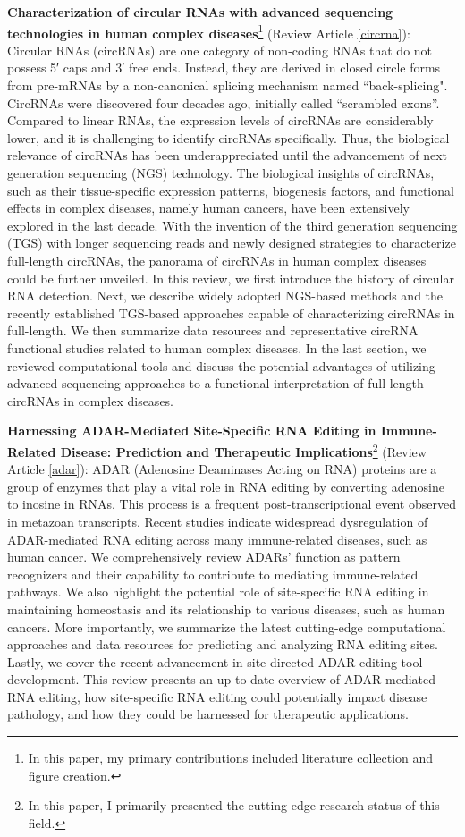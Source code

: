 \textbf{Characterization of circular RNAs with advanced sequencing technologies in human complex diseases}\footnote{In this paper, my primary contributions included literature collection and figure creation.} (Review Article \ref{circrna}): Circular RNAs (circRNAs) are one category of non-coding RNAs that do not possess 5′ caps and 3′ free ends. Instead, they are derived in closed circle forms from pre-mRNAs by a non-canonical splicing mechanism named ``back-splicing". CircRNAs were discovered four decades ago, initially called ``scrambled exons''. Compared to linear RNAs, the expression levels of circRNAs are considerably lower, and it is challenging to identify circRNAs specifically. Thus, the biological relevance of circRNAs has been underappreciated until the advancement of next generation sequencing (NGS) technology. The biological insights of circRNAs, such as their tissue-specific expression patterns, biogenesis factors, and functional effects in complex diseases, namely human cancers, have been extensively explored in the last decade. With the invention of the third generation sequencing (TGS) with longer sequencing reads and newly designed strategies to characterize full-length circRNAs, the panorama of circRNAs in human complex diseases could be further unveiled. In this review, we first introduce the history of circular RNA detection. Next, we describe widely adopted NGS-based methods and the recently established TGS-based approaches capable of characterizing circRNAs in full-length. We then summarize data resources and representative circRNA functional studies related to human complex diseases. In the last section, we reviewed computational tools and discuss the potential advantages of utilizing advanced sequencing approaches to a functional interpretation of full-length circRNAs in complex diseases.

\clearpage
\textbf{Harnessing ADAR-Mediated Site-Specific RNA Editing in Immune-Related Disease: Prediction and Therapeutic Implications}\footnote{In this paper, I primarily presented the cutting-edge research status of this field.} (Review Article \ref{adar}): ADAR (Adenosine Deaminases Acting on RNA) proteins are a group of enzymes that play a vital role in RNA editing by converting adenosine to inosine in RNAs. This process is a frequent post-transcriptional event observed in metazoan transcripts. Recent studies indicate widespread dysregulation of ADAR-mediated RNA editing across many immune-related diseases, such as human cancer. We comprehensively review ADARs’ function as pattern recognizers and their capability to contribute to mediating immune-related pathways. We also highlight the potential role of site-specific RNA editing in maintaining homeostasis and its relationship to various diseases, such as human cancers. More importantly, we summarize the latest cutting-edge computational approaches and data resources for predicting and analyzing RNA editing sites. Lastly, we cover the recent advancement in site-directed ADAR editing tool development. This review presents an up-to-date overview of ADAR-mediated RNA editing, how site-specific RNA editing could potentially impact disease pathology, and how they could be harnessed for therapeutic applications.
